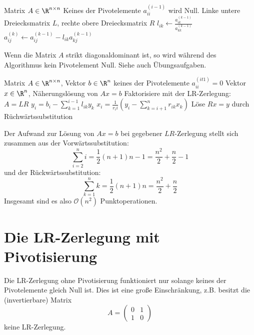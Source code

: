 \documentclass{mycourse}
\begin{document}
\begin{alg}[LR-Zerlegung]
\label{alg:3.5}
\begin{algorithmic}
	\Input Matrix $A\in \R^{n\times n}$
	\Assert Keines der Pivotelemente $a_{ii}^{(i-1)}$ wird Null.
	\Output Linke untere Dreiecksmatrix $L$, rechte obere Dreiecksmatrix $R$
	\Statex
			\State $l_{ik} \gets \frac{a_{ik}^{(k-1)}}{a_{kk}^{(k-1)}}$
		\EndFor
			\State $a_{ij}^{(k)} \gets a_{ij}^{(k-1)} - l_{ik} a_{kj}^{(k-1)}$
		\EndFor
	\EndFor
\end{algorithmic}

\begin{note}
	Wenn die Matrix $A$ strikt diagonaldominant ist, so wird während des Algorithmus kein Pivotelement Null.
	Siehe auch Übungsaufgaben.
\end{note}
\end{alg}


\begin{alg}[Gaußalgorithmus]
	\label{3.6}
	\begin{algorithmic}
		\Input Matrix $A\in \R^{n\times n}$, Vektor $b\in \R^n$
		\Assume keines der Pivotelemente $a_{ii}^{(it1)}=0$
		\Output Vektor $x\in \R^n$, Näherungslösung von $Ax=b$
		\Statex
		\State Faktorisiere mit der LR-Zerlegung: $A =LR$
			\State $\displaystyle y_i = b_i - \sum_{k=1}^{i-1} l_{ik}y_k$
		\EndFor
			\State $\displaystyle x_i = \frac 1{r_ii} \left(y_i -\sum_{k=i+1}^n r_{ik} x_k\right)$
			\Comment Löse $Rx=y$ durch Rüchwärtssubstitution
		\EndFor
	\end{algorithmic}

	Der Aufwand zur Lösung von $Ax=b$ bei gegebener $LR$-Zerlegung stellt sich zusammen aus der Vorwärtssubstitution:
	\[
	\sum_{i=2}^ni = \frac 12 (n+1)n-1 = \frac {n^2}2 +\frac n2 -1
	\]
	und der Rückwärtssubstitution:
	\[
	\sum_{k=1}^nk = \frac 12 (n+1)n = \frac {n^2}2 +\frac n2
	\]
	Insgesamt sind es also $\mathcal O(n^2)$ Punktoperationen.
\end{alg}

\section{Die LR-Zerlegung mit Pivotisierung}

Die LR-Zerlegung ohne Pivotisierung funktioniert nur solange keines der Pivotelemente gleich Null ist.
Dies ist eine große Einschränkung, z.B. besitzt die (invertierbare) Matrix
\[
A=\begin{pmatrix}0&1\\1&0\end{pmatrix}
\]
keine LR-Zerlegung.
\end{document}
